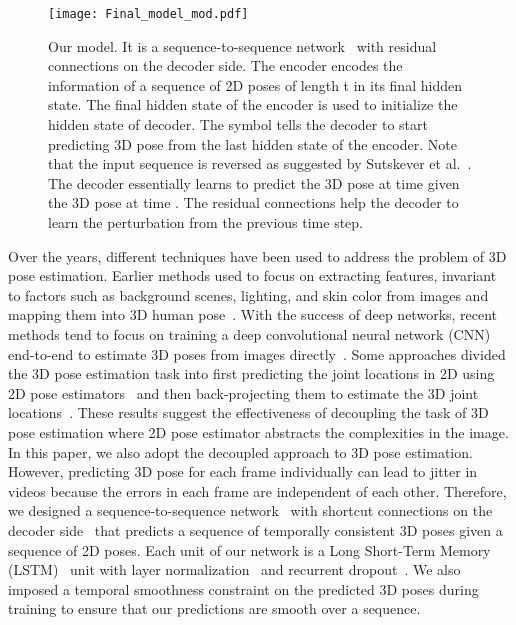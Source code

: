 \documentclass[runningheads]{llncs}
\begin{document}
\begin{figure*}
\centering
\texttt{[image: Final\_model\_mod.pdf]}
\caption{Our model. It is a sequence-to-sequence network~\cite{sutskever2014sequence} with residual connections on the decoder side. The encoder encodes the information of a sequence of 2D poses of length t in its final hidden state. The final hidden state of the encoder is used to initialize the hidden state of decoder. The  symbol tells the decoder to start predicting 3D pose from the last hidden state of the encoder.  Note that the input sequence is reversed as suggested by Sutskever et al.~\cite{sutskever2014sequence}.  The decoder essentially learns to predict the 3D pose at time  given the 3D pose at time . The residual connections help the decoder to learn the perturbation from the previous time step.}
\vspace{-3mm}
\label{fig:network_model}   \end{figure*}


Over the years, different techniques have been used to address the problem of 3D pose estimation. Earlier methods used to focus on extracting features, invariant to factors such as background scenes, lighting, and skin color from images and mapping them into 3D human pose~\cite{AgarwalT04,bb93102,bb41073,bb93266}. With the success of deep networks, recent methods tend to focus on training a deep convolutional neural network (CNN) end-to-end to estimate 3D poses from images directly~\cite{tekin2016structured,volumetric,li20143d,mehta2016monocular,zhou2016deep,mehta2017vnect,niemonocular,linCVPR17RPSM,park20163d,sun2017compositional,tekin2017learning}. Some approaches divided the 3D pose estimation task into first predicting the joint locations in 2D using 2D pose estimators~\cite{cpm,stacked-hourglass} and then back-projecting them to estimate the 3D joint locations~\cite{ramakrishna2012reconstructing,zhou2016sparseness,akhter2015pose,bogo2016keep,distance-matrix,JMartinez:ICCV:2017}. These results suggest the effectiveness of decoupling the task of 3D pose estimation where 2D pose estimator abstracts the complexities in the image. In this paper, we also adopt the decoupled approach to 3D pose estimation. However, predicting 3D pose for each frame individually can lead to jitter in videos because the errors in each frame are independent of each other. Therefore, we designed a sequence-to-sequence network~\cite{sutskever2014sequence} with shortcut connections on the decoder side~\cite{he2016deep} that predicts a sequence of temporally consistent 3D poses given a sequence of 2D poses. Each unit of our network is a Long Short-Term Memory (LSTM)~\cite{hochreiter1997long} unit with layer normalization~\cite{ba2016layer} and recurrent dropout~\cite{zaremba2014recurrent}. We also imposed a temporal smoothness constraint on the predicted 3D poses during training to ensure that our predictions are smooth over a sequence. 
\end{document}
